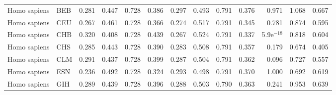 \begin{longtable}{llrrrrrrrrrrr}
        Homo sapiens &                       BEB &                              0.281 &                               0.447 &                 0.728 &                 0.386 &                              0.297 &                               0.493 &                 0.791 &                 0.376 &         0.971 &  1.068 &  0.667 \\
        Homo sapiens &                       CEU &                              0.267 &                               0.461 &                 0.728 &                 0.366 &                              0.274 &                               0.517 &                 0.791 &                 0.345 &         0.781 &  0.874 &  0.595 \\
        Homo sapiens &                       CHB &                              0.320 &                               0.408 &                 0.728 &                 0.439 &                              0.267 &                               0.524 &                 0.791 &                 0.337 &  5.9e$^{-18}$ &  0.818 &  0.604 \\
        Homo sapiens &                       CHS &                              0.285 &                               0.443 &                 0.728 &                 0.390 &                              0.283 &                               0.508 &                 0.791 &                 0.357 &         0.179 &  0.674 &  0.405 \\
        Homo sapiens &                       CLM &                              0.291 &                               0.437 &                 0.728 &                 0.399 &                              0.287 &                               0.504 &                 0.791 &                 0.362 &         0.096 &  0.727 &  0.557 \\
        Homo sapiens &                       ESN &                              0.236 &                               0.492 &                 0.728 &                 0.324 &                              0.293 &                               0.498 &                 0.791 &                 0.370 &         1.000 &  0.692 &  0.619 \\
        Homo sapiens &                       GIH &                              0.289 &                               0.439 &                 0.728 &                 0.396 &                              0.288 &                               0.503 &                 0.790 &                 0.363 &         0.241 &  0.953 &  0.639 \\

\end{longtable}
